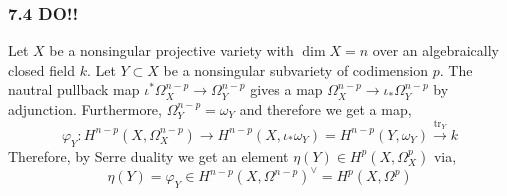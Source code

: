\documentclass[12pt]{article}
\begin{document}
\subsubsection{7.4 DO!!}

\renewcommand{\tr}{\mathrm{tr}}

Let $X$ be a nonsingular projective variety with $\dim{X} = n$ over an algebraically closed field $k$. Let $Y \subset X$ be a nonsingular subvariety of codimension $p$. The nautral pullback map $\iota^* \Omega_{X}^{n-p} \to \Omega_{Y}^{n-p}$ gives a map $\Omega_{X}^{n - p} \to \iota_* \Omega_{Y}^{n-p}$ by adjunction. Furthermore, $\Omega_{Y}^{n-p} = \omega_Y$ and therefore we get a map,
\[ \varphi_Y : H^{n-p}(X, \Omega_X^{n-p}) \to H^{n-p}(X, \iota_* \omega_Y) = H^{n-p}(Y, \omega_Y) \xrightarrow{\mathrm{tr}_Y} k \]
Therefore, by Serre duality we get an element $\eta(Y) \in H^p(X, \Omega_X^p)$ via,
\[ \eta(Y) = \varphi_Y \in H^{n-p}(X, \Omega^{n-p})^\vee = H^p(X, \Omega^p) \]
\end{document}
